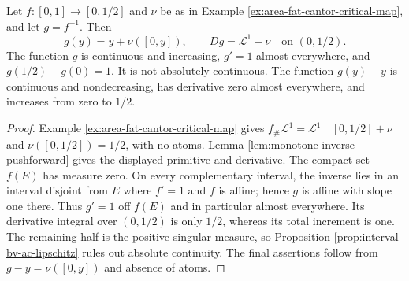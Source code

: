 \begin{example}\label{ex:fat-cantor-inverse-singular-part}
Let $f:[0,1]\to[0,1/2]$ and $\nu$ be as in Example \ref{ex:area-fat-cantor-critical-map}, and let $g=f^{-1}$. Then
\[
 g(y)=y+\nu([0,y]),\qquad Dg=\mathcal L^1+\nu
 \quad\text{on }(0,1/2).
\]
The function $g$ is continuous and increasing, $g'=1$ almost everywhere, and $g(1/2)-g(0)=1$. It is not absolutely continuous. The function $g(y)-y$ is continuous and nondecreasing, has derivative zero almost everywhere, and increases from zero to $1/2$.
\end{example}
\begin{proof}
Example \ref{ex:area-fat-cantor-critical-map} gives $f_\#\mathcal L^1=\mathcal L^1\llcorner[0,1/2]+\nu$ and $\nu([0,1/2])=1/2$, with no atoms. Lemma \ref{lem:monotone-inverse-pushforward} gives the displayed primitive and derivative. The compact set $f(E)$ has measure zero. On every complementary interval, the inverse lies in an interval disjoint from $E$ where $f'=1$ and $f$ is affine; hence $g$ is affine with slope one there. Thus $g'=1$ off $f(E)$ and in particular almost everywhere. Its derivative integral over $(0,1/2)$ is only $1/2$, whereas its total increment is one. The remaining half is the positive singular measure, so Proposition \ref{prop:interval-bv-ac-lipschitz} rules out absolute continuity. The final assertions follow from $g-y=\nu([0,y])$ and absence of atoms.
\end{proof}

